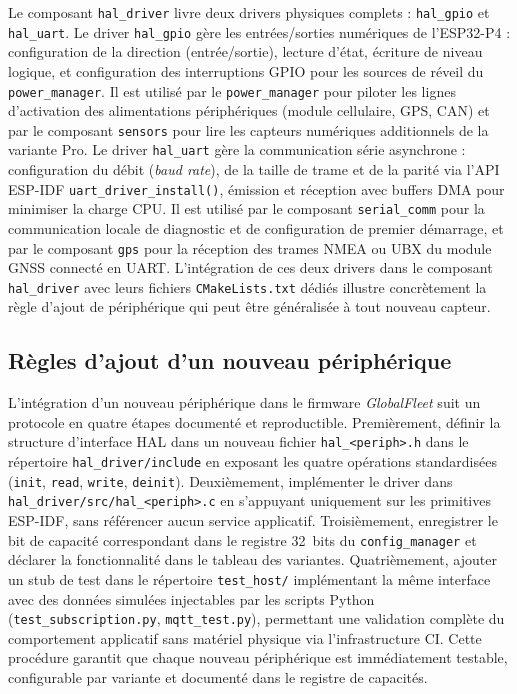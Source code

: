 Le composant \texttt{hal\_driver} livre deux drivers physiques
complets : \texttt{hal\_gpio} et \texttt{hal\_uart}. Le driver
\texttt{hal\_gpio} gère les entrées/sorties numériques de l'ESP32-P4 :
configuration de la direction (entrée/sortie), lecture d'état,
écriture de niveau logique, et configuration des interruptions GPIO
pour les sources de réveil du \texttt{power\_manager}. Il est utilisé
par le \texttt{power\_manager} pour piloter les lignes d'activation
des alimentations périphériques (module cellulaire, GPS, CAN) et par
le composant \texttt{sensors} pour lire les capteurs numériques
additionnels de la variante Pro. Le driver \texttt{hal\_uart}
gère la communication série asynchrone : configuration du débit
(\textit{baud rate}), de la taille de trame et de la parité via
l'API ESP-IDF \texttt{uart\_driver\_install()}, émission et réception
avec buffers DMA pour minimiser la charge CPU. Il est utilisé par le
composant \texttt{serial\_comm} pour la communication locale de
diagnostic et de configuration de premier démarrage, et par le
composant \texttt{gps} pour la réception des trames NMEA ou UBX
du module GNSS connecté en UART. L'intégration de ces deux drivers
dans le composant \texttt{hal\_driver} avec leurs fichiers
\texttt{CMakeLists.txt} dédiés illustre concrètement la règle d'ajout
de périphérique qui peut être généralisée à tout nouveau capteur.

\subsection{Règles d'ajout d'un nouveau périphérique}
\label{subsec:hal_stubs}

L'intégration d'un nouveau périphérique dans le firmware
\textit{GlobalFleet} suit un protocole en quatre étapes documenté
et reproductible. Premièrement, définir la structure d'interface HAL
dans un nouveau fichier \texttt{hal\_<periph>.h} dans le répertoire
\texttt{hal\_driver/include} en exposant les quatre opérations
standardisées (\texttt{init}, \texttt{read}, \texttt{write},
\texttt{deinit}). Deuxièmement, implémenter le driver dans
\texttt{hal\_driver/src/hal\_<periph>.c} en s'appuyant uniquement
sur les primitives ESP-IDF, sans référencer aucun service applicatif.
Troisièmement, enregistrer le bit de capacité correspondant dans le
registre 32~bits du \texttt{config\_manager} et déclarer la
fonctionnalité dans le tableau des variantes. Quatrièmement, ajouter
un stub de test dans le répertoire \texttt{test\_host/} implémentant
la même interface avec des données simulées injectables par les
scripts Python (\texttt{test\_subscription.py},
\texttt{mqtt\_test.py}), permettant une validation complète du
comportement applicatif sans matériel physique via l'infrastructure
CI. Cette procédure garantit que chaque nouveau périphérique est
immédiatement testable, configurable par variante et documenté dans
le registre de capacités.

